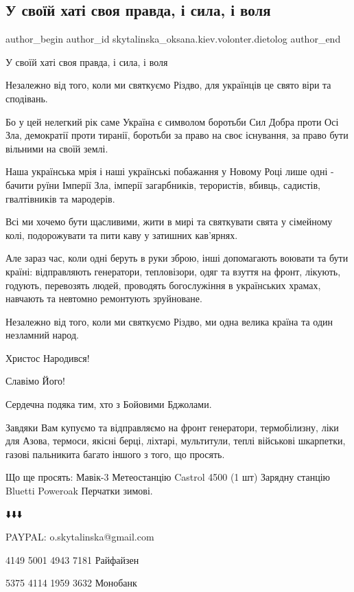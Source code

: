  
 
 
 
 

\subsection{У своїй хаті своя правда, і сила, і воля}
\label{sec:07_01_2023.fb.skytalinska_oksana.kiev.volonter.dietolog.1.u_svo_i_khat__svoya_}

\ifcmt
 author_begin
   author_id skytalinska_oksana.kiev.volonter.dietolog
 author_end
\fi

У своїй хаті своя правда, і сила, і воля

Незалежно від того, коли ми святкуємо Різдво, для українців це свято віри та
сподівань. 

Бо у цей нелегкий рік саме Україна є символом боротьби  Сил Добра проти Осі
Зла, демократії проти тиранії, боротьби за право на своє існування, за право
бути вільними на своїй землі.

Наша українська мрія і наші українські побажання у Новому Році лише одні -
бачити руїни Імперії Зла, імперії загарбників, терористів, вбивць, садистів,
гвалтівників та мародерів.

Всі ми хочемо бути щасливими, жити в мирі та святкувати свята у сімейному колі,
подорожувати та пити каву у затишних кав'ярнях.

Але зараз час, коли одні беруть в руки зброю, інші допомагають воювати та бути
країні: відправляють генератори, тепловізори, одяг та взуття на фронт, лікують,
годують, перевозять людей, проводять богослужіння в українських храмах,
навчають та невтомно ремонтують зруйноване.

Незалежно від того, коли ми святкуємо Різдво, ми одна велика країна та один
незламний народ.

Христос Народився!

Славімо Його!

Сердечна подяка тим, хто з Бойовими Бджолами.

Завдяки Вам купуємо та відправляємо на фронт генератори, термобілизну, ліки для
Азова, термоси, якісні берці, ліхтарі, мультитули, теплі військові шкарпетки,
газові пальникита багато іншого з того, що просять.

Що ще просять:
Мавік-3 
Метеостанцію Castrol 4500 (1 шт)
Зарядну станцію Bluetti Poweroak 
Перчатки зимові.

⬇️⬇️⬇️

PAYPAL: o.skytalinska@gmail.com

4149 5001 4943 7181 Райфайзен

5375 4114 1959 3632 Монобанк
